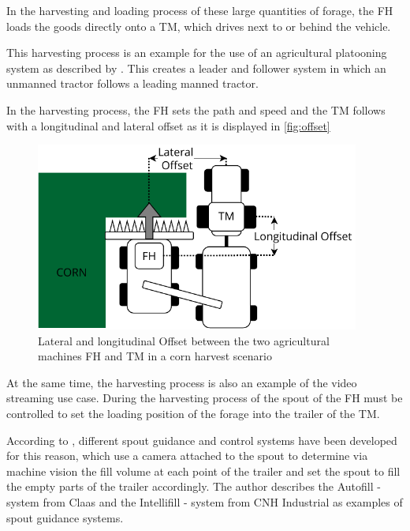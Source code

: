 \documentclass[]{nsm-thesis}
\begin{document}
\textcite{Faustzahlen_Landwirtschaft}

In the harvesting and loading process of these large quantities of forage, the \ac{FH} loads the goods directly onto a \ac{TM}, which drives next to or behind the vehicle.

This harvesting process is an example for the use of an agricultural platooning system as described by 
\textcite{zhang_method_2009}. This creates a leader and follower system in which an unmanned tractor follows a leading manned tractor.

In the harvesting process, the \ac{FH} sets the path and speed and the \ac{TM} follows with a longitudinal and lateral offset as it is displayed in \autoref{fig:offset}
\begin{figure}%
	\centering
	\includegraphics[width=0.95\textwidth]{figures/offset_platoon.pdf}
	\caption{Lateral and longitudinal Offset between the two agricultural machines \ac{FH} and \ac{TM} in a corn harvest scenario}%
	\label{fig:offset}%
\end{figure}

At the same time, the harvesting process is also an example of the video streaming use case. During the harvesting process of the spout of the \ac{FH} must be controlled to set the loading position of the forage into the trailer of the \ac{TM}.

According to \textcite{HMThesis}, different spout guidance and control systems have been developed for this reason, which use a camera attached to the spout to determine via machine vision the fill volume at each point of the trailer and set the spout to fill the empty parts of the trailer accordingly. The author describes the Autofill -  system from Claas and the Intellifill - system from CNH Industrial as examples of spout guidance systems. 
\end{document}
